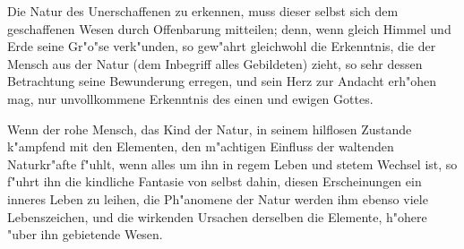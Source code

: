 \documentclass[a4paper, 11pt, oneside, polutonikogreek, german]{article}
\begin{document}
Die Natur des Unerschaffenen zu erkennen, muss dieser selbst sich dem geschaffenen Wesen durch Offenbarung mitteilen; denn, wenn gleich Himmel und Erde seine Gr"o"se verk"unden, so gew"ahrt gleichwohl die Erkenntnis, die der Mensch aus der Natur (dem Inbegriff alles Gebildeten) zieht, so sehr dessen Betrachtung seine Bewunderung erregen, und sein Herz zur Andacht erh"ohen mag, nur unvollkommene Erkenntnis des einen und ewigen Gottes.

Wenn der rohe Mensch, das Kind der Natur, in seinem hilflosen Zustande k"ampfend mit den Elementen, den m"achtigen Einfluss der waltenden Naturkr"afte f"uhlt, wenn alles um ihn in regem Leben und stetem Wechsel ist, so f"uhrt ihn die kindliche Fantasie von selbst dahin, diesen Erscheinungen ein inneres Leben zu leihen, die Ph"anomene der Natur werden ihm ebenso viele Lebenszeichen, und die wirkenden Ursachen derselben die Elemente, h"ohere "uber ihn gebietende Wesen.
\end{document}
